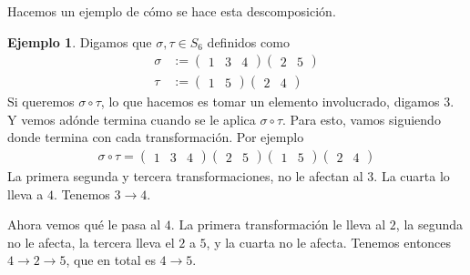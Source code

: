 \documentclass{article}
\theoremstyle{definition}
\newtheorem{ejemplo}{Ejemplo}[section]
\begin{document}
Hacemos un ejemplo de cómo se hace esta descomposición.
\begin{ejemplo}
    Digamos que $\sigma,\tau\in S_6$ definidos como
    \begin{align*}
        \sigma & :=\begin{pmatrix}
                       1 & 3 & 4
                   \end{pmatrix}\begin{pmatrix}
                                    2 & 5
                                \end{pmatrix} \\
        \tau   & :=\begin{pmatrix}
                       1 & 5
                   \end{pmatrix}\begin{pmatrix}
                                    2 & 4
                                \end{pmatrix}
    \end{align*}
    Si queremos $\sigma\circ \tau$, lo que hacemos es tomar un elemento involucrado, digamos $3$. Y vemos adónde termina cuando se le aplica $\sigma\circ\tau$. Para esto, vamos siguiendo donde termina con cada transformación. Por ejemplo
    \begin{align*}
        \sigma\circ\tau=\begin{pmatrix}
                            1 & 3 & 4
                        \end{pmatrix}\begin{pmatrix}
                                         2 & 5
                                     \end{pmatrix}\begin{pmatrix}
                                                      1 & 5
                                                  \end{pmatrix}\begin{pmatrix}
                                                                   2 & 4
                                                               \end{pmatrix}
    \end{align*}
    La primera segunda y tercera transformaciones, no le afectan al $3$. La cuarta lo lleva a $4$. Tenemos $3\to 4$.

    Ahora vemos qué le pasa al $4$. La primera transformación le lleva al $2$, la segunda no le afecta, la tercera lleva el $2$ a $5$, y la cuarta no le afecta. Tenemos entonces $4\to 2\to 5$, que en total es $4\to 5$.


\end{ejemplo}
\end{document}
